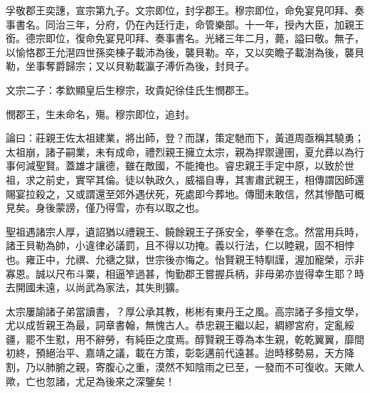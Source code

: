 \begin{pinyinscope}
孚敬郡王奕譓，宣宗第九子。文宗即位，封孚郡王。穆宗即位，命免宴見叩拜、奏事書名。同治三年，分府，仍在內廷行走，命管樂部。十一年，授內大臣，加親王銜。德宗即位，復命免宴見叩拜、奏事書名。光緒三年二月，薨，謚曰敬。無子，以愉恪郡王允潖四世孫奕棟子載沛為後，襲貝勒。卒，又以奕瞻子載澍為後，襲貝勒，坐事奪爵歸宗；又以貝勒載瀛子溥伒為後，封貝子。

文宗二子：孝欽顯皇后生穆宗，玫貴妃徐佳氏生憫郡王。

憫郡王，生未命名，殤。穆宗即位，追封。

論曰：莊親王佐太祖建業，將出師，登？而謀，策定馳而下，黃道周亟稱其驍勇；太祖崩，諸子嗣業，未有成命，禮烈親王擁立太宗，親為捍禦邊圉，夏允彞以為行事何減聖賢。蓋雄才讓德，雖在敵國，不能掩也。睿忠親王手定中原，以致於世祖，求之前史，實罕其倫。徒以執政久，威福自專，其害肅武親王，相傳謂因師還賜宴拉殺之，又或謂還至郊外遇伏死，死處即今葬地。傳聞未敢信，然其慘酷可概見矣。身後蒙謗，僅乃得雪，亦有以取之也。

聖祖遇諸宗人厚，遺詔猶以禮親王、饒餘親王子孫安全，拳拳在念。然當用兵時，諸王貝勒為帥，小違律必議罰，且不得以功掩。義以行法，仁以睦親，固不相悖也。雍正中，允禩、允禟之獄，世宗後亦悔之。怡賢親王特馴謹，渥加寵榮，示非寡恩。誠以尺布斗粟，相逼笮過甚，恂勤郡王嘗握兵柄，非母弟亦豈得幸生耶？時去開國未遠，以尚武為家法，其失則獷。

太宗屢諭諸子弟當讀書，？厚公承其教，彬彬有東丹王之風。高宗諸子多擅文學，尤以成哲親王為最，詞章書翰，無愧古人。恭忠親王繼以起，綢繆宮府，定亂綏疆，罷不生懟，用不辭勞，有純臣之度焉。醇賢親王尊為本生親，乾乾翼翼，靡間初終，預絕治平、嘉靖之議，載在方策，彰彰邁前代遠甚。迨時移勢易，天方降割，乃以肺腑之親，寄腹心之重，漠然不知陰雨之已至，一發而不可復收。天歟人歟，亡也忽諸，尤足為後來之深鑒矣！


\end{pinyinscope}